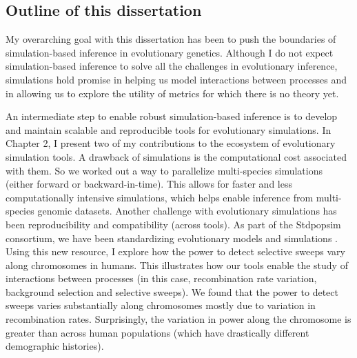 
\subsection{Outline of this dissertation}

My overarching goal with this dissertation has been to push the boundaries of simulation-based inference in evolutionary genetics.
Although I do not expect simulation-based inference to solve all the challenges in evolutionary inference,
simulations hold promise in helping us model interactions between processes and in allowing us to explore the utility of metrics for which there is no theory yet.

An intermediate step to enable robust simulation-based inference is to develop and maintain scalable and reproducible tools for evolutionary simulations.
In Chapter 2, I present two of my contributions to the \tskit ecosystem of evolutionary simulation tools.
A drawback of simulations is the computational cost associated with them.
So we worked out a way to parallelize multi-species simulations (either forward or backward-in-time).
This allows for faster and less computationally intensive simulations, 
which helps enable inference from multi-species genomic datasets.
Another challenge with evolutionary simulations has been reproducibility and compatibility (across tools).
As part of the Stdpopsim consortium, we have been standardizing evolutionary models and simulations \citep{adrion_community-maintained_2020, lauterbur_expanding_2023}.
Using this new resource, I explore how the power to detect selective sweeps vary along chromosomes in humans.
This illustrates how our tools enable the study of interactions between processes (in this case, recombination rate variation, background selection and selective sweeps).
We found that the power to detect sweeps varies substantially along chromosomes mostly due to variation in recombination rates.
Surprisingly, the variation in power along the chromosome is greater than across human populations (which have drastically different demographic histories).


